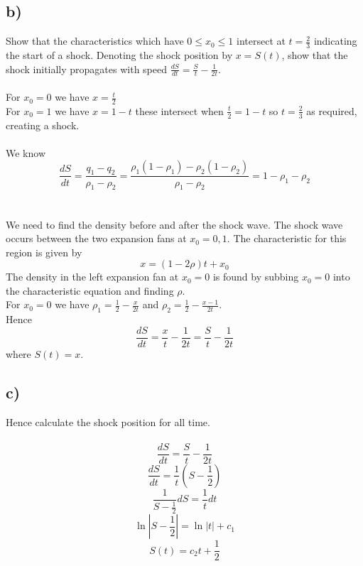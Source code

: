 \documentclass[1pt]{article}
\begin{document}
\subsection*{b)}
Show that the characteristics which have $0 \leq x_0 \leq 1$ intersect at $t = \frac{2}{3}$ indicating the start of a shock. Denoting the shock position by $x = S(t)$, show that the shock initially propagates with speed $\frac{dS}{dt} = \frac{S}{t} - \frac{1}{2t}$.
\\
\\ For $x_0=0$ we have $x=\frac{t}{2}$
\\ For $x_0=1$ we have $x=1-t$ these intersect when $\frac{t}{2}=1-t$ so $t=\frac{2}{3}$ as required, creating a shock.
\\
\\ We know $$\frac{dS}{dt}=\frac{q_1-q_2}{\rho_1-\rho_2}=\frac{\rho_1(1-\rho_1)-\rho_2(1-\rho_2)}{\rho_1-\rho_2}=1-\rho_1-\rho_2$$
\\
\\ We need to find the density before and after the shock wave. The shock wave occurs between the two expansion fans at $x_0=0,1$. The characteristic for this region is given by $$x=(1-2\rho)t+x_0$$ The density in the left expansion fan at $x_0=0$ is found by subbing $x_0=0$ into the characteristic equation and finding $\rho$.
\\ For $x_0=0$ we have $\rho_1=\frac{1}{2}-\frac{x}{2t}$ and $\rho_2=\frac{1}{2}-\frac{x-1}{2t}$.
\\ Hence $$\frac{dS}{dt}=\frac{x}{t}-\frac{1}{2t}=\frac{S}{t}-\frac{1}{2t}$$ where $S(t)=x$.

\subsection*{c)}
Hence calculate the shock position for all time.
\\
\\ $$\frac{dS}{dt}=\frac{S}{t}-\frac{1}{2t}$$
$$\frac{dS}{dt}=\frac{1}{t}(S-\frac{1}{2})$$
$$\frac{1}{S-\frac{1}{2}}dS=\frac{1}{t}dt$$
$$\ln|S-\frac{1}{2}|=\ln|t|+c_1$$
$$S(t)=c_2t+\frac{1}{2}$$
\end{document}
